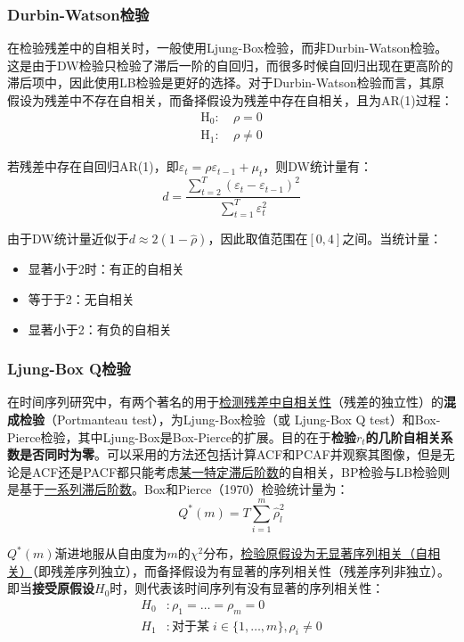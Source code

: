 \documentclass[11pt]{article}
\begin{document}
\subsubsection{Durbin-Watson检验}

在检验残差中的自相关时，一般使用Ljung-Box检验，而非Durbin-Watson检验。这是由于DW检验只检验了滞后一阶的自回归，而很多时候自回归出现在更高阶的滞后项中，因此使用LB检验是更好的选择。对于Durbin-Watson检验而言，其原假设为残差中不存在自相关，而备择假设为残差中存在自相关，且为AR(1)过程：
\begin{align*}
    \text{H}_0: \ & \rho = 0 \\
    \text{H}_1: \ & \rho \neq 0
\end{align*}

若残差中存在自回归AR(1)，即$\varepsilon_t = \rho \varepsilon_{t-1} + \mu_t$，则DW统计量有：
\begin{equation*}
    d = \frac{\sum_{t=2}^{T} (\varepsilon_t - \varepsilon_{t-1})^2}{\sum_{t=1}^{T} \varepsilon^2_t}
\end{equation*}

由于DW统计量近似于$d \approx 2(1-\hat{\rho})$，因此取值范围在$[0,4]$之间。当统计量：
\begin{itemize}
    \item 显著小于2时：有正的自相关
    \item 等于于2：无自相关
    \item 显著小于2：有负的自相关
\end{itemize}

\subsubsection{Ljung-Box Q检验}

在时间序列研究中，有两个著名的用于\uline{检测残差中自相关性}（残差的独立性）的\textbf{混成检验}（Portmanteau test），为Ljung-Box检验（或 Ljung-Box Q test）和Box-Pierce检验，其中Ljung-Box是Box-Pierce的扩展。目的在于\textbf{检验$r_t$的几阶自相关系数是否同时为零}。可以采用的方法还包括计算ACF和PCAF并观察其图像，但是无论是ACF还是PACF都只能考虑\uline{某一特定滞后阶数}的自相关，BP检验与LB检验则是基于\uline{一系列滞后阶数}。Box和Pierce（1970）检验统计量为：
\begin{equation*}
    Q^{*}(m) = T\sum_{i=1}^{m} \hat{\rho}_{l}^{2}
\end{equation*}

$Q^{*}(m)$渐进地服从自由度为$m$的$\chi^2$分布，\uline{检验原假设为无显著序列相关（自相关）}（即残差序列独立），而备择假设为有显著的序列相关性（残差序列非独立）。即当\textbf{接受原假设}$H_0$时，则代表该时间序列有没有显著的序列相关性：
\begin{align*}
    H_0&: \rho_1=\dots=\rho_{m}=0 \\
    H_1&: \text{对于某}\; i \in \{1,\dots,m\},\rho_i \neq 0
\end{align*}
\end{document}
